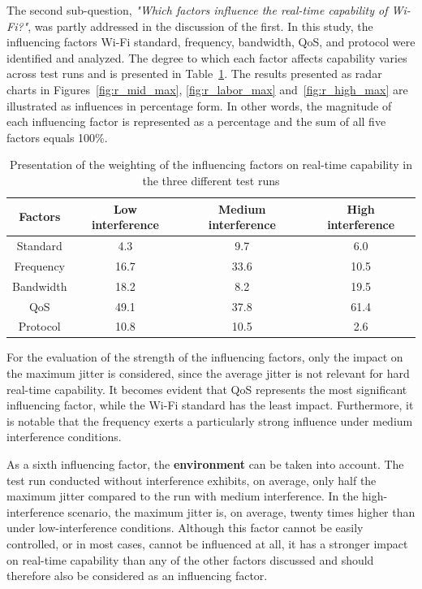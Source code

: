 The second sub-question, \textit{"Which factors influence the real-time capability of Wi-Fi?"}, was partly addressed in the discussion of the first.  
In this study, the influencing factors Wi-Fi standard, frequency, bandwidth, \ac{QoS}, and protocol were identified and analyzed.  
The degree to which each factor affects capability varies across test runs and is presented in Table~\ref{tab:eval}.  
The results presented as radar charts in Figures~\ref{fig:r_mid_max}, \ref{fig:r_labor_max} and~\ref{fig:r_high_max} are illustrated as influences in percentage form.  
In other words, the magnitude of each influencing factor is represented as a percentage and the sum of all five factors equals 100\%.  

\begin{table}
\begin{tabular}{||c||c|c|c||}
\hline
\textbf{Factors} & \textbf{Low interference} & \textbf{Medium interference} & \textbf{High interference}\\
\hline\hline
Standard & 4.3 & 9.7 & 6.0  \\
\hline
Frequency & 16.7 & 33.6 & 10.5  \\
\hline
Bandwidth & 18.2 & 8.2 & 19.5  \\
\hline
\ac{QoS} & 49.1 & 37.8 & 61.4  \\
\hline
Protocol & 10.8 & 10.5 & 2.6   \\
\hline
\end{tabular}
\caption{Presentation of the weighting of the influencing factors on real-time capability in the three different test runs}
\label{tab:eval}
\end{table}

For the evaluation of the strength of the influencing factors, only the impact on the maximum jitter is considered, since the average jitter is not relevant for hard real-time capability.  
It becomes evident that \ac{QoS} represents the most significant influencing factor, while the Wi-Fi standard has the least impact.  
Furthermore, it is notable that the frequency exerts a particularly strong influence under medium interference conditions.  

As a sixth influencing factor, the \textbf{environment} can be taken into account.  
The test run conducted without interference exhibits, on average, only half the maximum jitter compared to the run with medium interference.  
In the high-interference scenario, the maximum jitter is, on average, twenty times higher than under low-interference conditions.  
Although this factor cannot be easily controlled, or in most cases, cannot be influenced at all, it has a stronger impact on real-time capability than any of the other factors discussed and should therefore also be considered as an influencing factor. 

